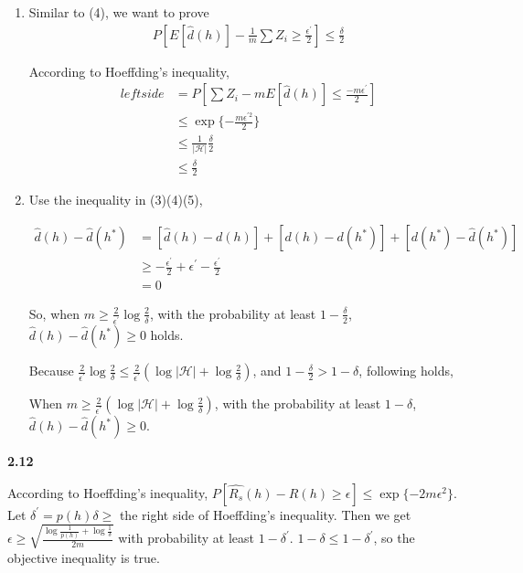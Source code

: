 \documentclass[12pt]{article}
\begin{document}
\begin{enumerate}[label=(\alph*), left=0pt]
    So 
    \begin{align*}
        P[\hat{d}(h^{*}) - d(h^{*}) \ge \frac{\epsilon^{'}}{2}] \le \frac{\delta}{2}
    \end{align*}, that is 

    \begin{align*}
        P[\hat{d}(h^{*}) - d(h^{*}) \le \frac{\epsilon^{'}}{2}] \ge 1 - \frac{\delta}{2} 
    \end{align*}

    \item 
    Similar to (4), we want to prove 
    \begin{align*}
        P[E[\hat{d} (h)] - \frac{1}{m} \sum Z_{i} \ge \frac{\epsilon ^{'}}{2}] \le \frac{\delta}{2}
    \end{align*}

    According to Hoeffding's inequality, 
    \begin{align*}
        left side &= P[\sum Z_{i} - m E[\hat{d} (h)] \le \frac{-m \epsilon ^{'}}{2}] \\
        &\le \exp\{-\frac{m \epsilon^{'2}}{2}\} \\
        &\le \frac{1}{|\mathcal{H}|} \frac{\delta}{2} \\ 
        &\le \frac{\delta}{2}
    \end{align*}

    \item 
    Use the inequality in (3)(4)(5), 

    \begin{align*}
        \hat{d}(h) - \hat{d}(h^{*}) 
        &= [\hat{d}(h) - d(h)] + [d(h) - d(h^{*})] + [d(h^{*}) - \hat{d}(h^{*})] \\ 
        &\ge -\frac{\epsilon^{'}}{2} + \epsilon^{'} - \frac{\epsilon^{'}}{2} \\
        &= 0
    \end{align*}

    So, when $m \ge \frac{2}{\epsilon^{'}} \log \frac{2}{\delta}$, with the probability at least 
    $1 - \frac{\delta}{2}$, $\hat{d}(h) - \hat{d}(h^{*}) \ge 0$ holds.

    Because $\frac{2}{\epsilon^{'}} \log \frac{2}{\delta} \le \frac{2}{\epsilon^{'}} (
    \log |\mathcal{H}| + \log \frac{2}{\delta})$, and $1 - \frac{\delta}{2} > 1 - \delta$, 
    following holds,

    When $m \ge \frac{2}{\epsilon^{'}} (\log |\mathcal{H}| + \log \frac{2}{\delta})$, with the 
    probability at least $1 - \delta$, $\hat{d}(h) - \hat{d}(h^{*}) \ge 0$.
\end{enumerate}

\vspace{1em}

\noindent \textbf{2.12}

According to Hoeffding's inequality, $P[\hat{R_{s}}(h) - R(h) \ge \epsilon] \le \exp \{-2m
\epsilon^{2}\}$. Let $\delta^{'} = p(h)\delta \ge$ the right side of Hoeffding's inequality.
Then we get $\epsilon \ge \sqrt{\frac{\log \frac{1}{p(h)} + \log \frac{1}{\delta}}{2m}}$ with 
probability at least $1 - \delta^{'}$. $1 - \delta \le 1 - \delta^{'}$, so the objective inequality
is true.
\end{document}
